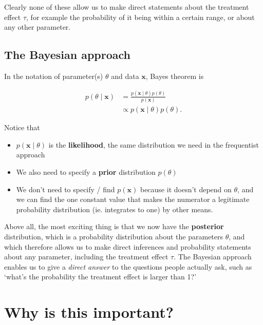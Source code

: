 \documentclass[
  openany]{book}
\providecommand{\tightlist}{%
  \setlength{\itemsep}{0pt}\setlength{\parskip}{0pt}}
\theoremstyle{definition}
\theoremstyle{definition}
\theoremstyle{definition}
\theoremstyle{definition}
\theoremstyle{remark}
\begin{document}
Clearly none of these allow us to make direct statements about the treatment effect \(\tau\), for example the probability of it being within a certain range, or about any other parameter.

\hypertarget{the-bayesian-approach-1}{%
\subsection*{The Bayesian approach}\label{the-bayesian-approach-1}}

In the notation of parameter(s) \(\theta\) and data \(\mathbf{x}\), Bayes theorem is

\begin{align*}
p\left(\theta\mid{\mathbf{x}}\right) &= \frac{p\left(\mathbf{x}\mid\theta\right)p\left(\theta\right)}{p\left(\mathbf{x}\right)}\\
&\propto p\left(\mathbf{x}\mid\theta\right)p\left(\theta\right).
\end{align*}

Notice that

\begin{itemize}
\tightlist
\item
  \(p\left(\mathbf{x}\mid\theta\right)\) is the \textbf{likelihood}, the same distribution we need in the frequentist approach
\item
  We also need to specify a \textbf{prior} distribution \(p\left(\theta\right)\)
\item
  We don't need to specify / find \(p\left(\mathbf{x}\right)\) because it doesn't depend on \(\theta\), and we can find the one constant value that makes the numerator a legitimate probability distribution (ie. integrates to one) by other means.
\end{itemize}

Above all, the most exciting thing is that we now have the \textbf{posterior} distribution, which is a probability distribution about the parameters \(\theta\), and which therefore allows us to make direct inferences and probability statements about any parameter, including the treatment effect \(\tau\). The Bayesian approach enables us to give a \emph{direct answer} to the questions people actually ask, such as `what's the probability the treatment effect is larger than 1?'

\hypertarget{why-is-this-important}{%
\section{Why is this important?}\label{why-is-this-important}}
\end{document}
